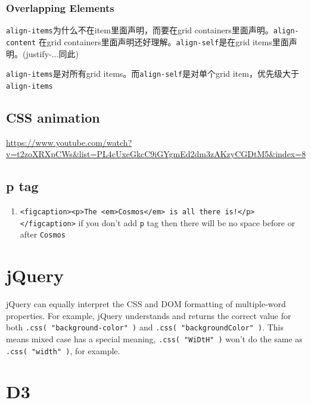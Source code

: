 \documentclass[a4paper, 12pt]{article}
\begin{document}
\subsubsection{Overlapping Elements}

\verb|align-items|为什么不在item里面声明，而要在grid containers里面声明。\verb|align-content| 在grid containers里面声明还好理解。\verb|align-self|是在grid items里面声明。(justify-...同此)

\verb|align-items|是对所有grid items。而\verb|align-self|是对单个grid item，优先级大于\verb|align-items|

\subsection{CSS animation}
\url{https://www.youtube.com/watch?v=t2zoXRXpCWs&list=PL4cUxeGkcC9iGYgmEd2dm3zAKzyCGDtM5&index=8}


\subsection{p tag}
\begin{enumerate}
\item \verb|<figcaption><p>The <em>Cosmos</em> is all there is!</p></figcaption>| if you don't add \verb|p| tag then there will be no space before or after \verb|Cosmos|
\end{enumerate}


\section{jQuery}
jQuery can equally interpret the CSS and DOM formatting of multiple-word properties. For example, jQuery understands and returns the correct value for both \verb|.css( "background-color" )| and \verb|.css( "backgroundColor" )|. This means mixed case has a special meaning, \verb|.css( "WiDtH" )| won't do the same as \verb|.css( "width" )|, for example.


\section{D3}
\end{document}

